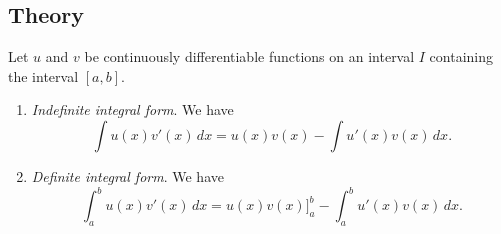  \subsection*{Theory}

\begin{namedtheorem}
Let $u$ and $v$ be continuously differentiable functions on an interval $I$ containing the interval $[a,b]$.
\begin{enumerate}
  \item {\em Indefinite integral form}. We have
  \[
  \int u(x)v'(x)\, dx= u(x)v(x)-\int u'(x)v(x)\, dx.
  \]
  \item {\em Definite integral form}. We have
  \[
  \int_a^b u(x)v'(x)\, dx= u(x)v(x)\Bigr]_a^b-\int_a^b u'(x)v(x)\, dx.
  \]
\end{enumerate}
\end{namedtheorem}


